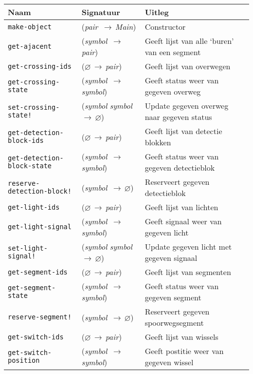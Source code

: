 \documentclass[a4paper, 11pt]{article}
\newcommand{\naar}{\,$\rightarrow$\,}
\renewcommand{\empty}{$\varnothing$}
\newcommand{\<}{\scriptsize\textless\normalsize}
\renewcommand{\>}{\scriptsize\textgreater\normalsize}
\begin{document}
\begin{table}[H]
	\begin{center}
		{
		\begin{tabular}{|l l l|}
			\hline
			\textbf{Naam} & \textbf{Signatuur} & \textbf{Uitleg}\\
			\hline
			\texttt{make-object} & (\textit{pair} \naar \textit{Main}) & Constructor\\
			\hline
			\texttt{get-ajacent} & (\textit{symbol} \naar \textit{pair}) & Geeft lijst van alle \lq buren' van een segment\\
			\texttt{get-crossing-ids} & (\empty \naar \textit{pair}) & Geeft lijst van overwegen\\
			\texttt{get-crossing-state} & (\textit{symbol} \naar \textit{symbol}) & Geeft status weer van gegeven overweg\\
			\texttt{set-crossing-state!} & (\textit{symbol} \textit{symbol} \naar \empty) & Update gegeven overweg naar gegeven status\\
			\texttt{get-detection-block-ids} & (\empty \naar \textit{pair}) & Geeft lijst van detectie blokken\\
			\texttt{get-detection-block-state} & (\textit{symbol} \naar \textit{symbol}) & Geeft status weer van gegeven detectieblok\\
			\texttt{reserve-detection-block!} & (\textit{symbol} \naar \empty) & Reserveert gegeven detectieblok\\
			\texttt{get-light-ids} & (\empty \naar \textit{pair}) & Geeft lijst van lichten\\
			\texttt{get-light-signal} & (\textit{symbol} \naar \textit{symbol}) & Geeft signaal weer van gegeven licht\\
			\texttt{set-light-signal!} & (\textit{symbol} \textit{symbol} \naar \empty) & Update gegeven licht met gegeven signaal\\
			\texttt{get-segment-ids} & (\empty \naar \textit{pair}) & Geeft lijst van segmenten\\
			\texttt{get-segment-state} & (\textit{symbol} \naar \textit{symbol}) & Geeft status weer van gegeven segment\\
			\texttt{reserve-segment!} & (\textit{symbol} \naar \empty) & Reserveert gegeven spoorwegsegment\\
			\texttt{get-switch-ids} & (\empty \naar \textit{pair}) & Geeft lijst van wissels\\
			\texttt{get-switch-position} & (\textit{symbol} \naar \textit{symbol}) & Geeft postitie weer van gegeven wissel\\

\end{tabular}}
\end{center}
\end{table}
\end{document}
